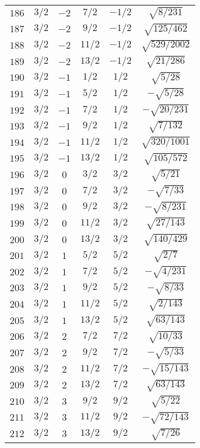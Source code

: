 \begin{table}
\begin{center}
\begin{tabular}{|c|c|c|c|c|c|}
$186$ & $3/2$ & $-2$ & $7/2$ & $-1/2$ & $\sqrt{8/231}$ \\ 
$187$ & $3/2$ & $-2$ & $9/2$ & $-1/2$ & $\sqrt{125/462}$ \\ 
$188$ & $3/2$ & $-2$ & $11/2$ & $-1/2$ & $\sqrt{529/2002}$ \\ 
$189$ & $3/2$ & $-2$ & $13/2$ & $-1/2$ & $\sqrt{21/286}$ \\ 
$190$ & $3/2$ & $-1$ & $1/2$ & $1/2$ & $\sqrt{5/28}$ \\ 
$191$ & $3/2$ & $-1$ & $5/2$ & $1/2$ & $-\sqrt{5/28}$ \\ 
$192$ & $3/2$ & $-1$ & $7/2$ & $1/2$ & $-\sqrt{20/231}$ \\ 
$193$ & $3/2$ & $-1$ & $9/2$ & $1/2$ & $\sqrt{7/132}$ \\ 
$194$ & $3/2$ & $-1$ & $11/2$ & $1/2$ & $\sqrt{320/1001}$ \\ 
$195$ & $3/2$ & $-1$ & $13/2$ & $1/2$ & $\sqrt{105/572}$ \\ 
$196$ & $3/2$ & $0$ & $3/2$ & $3/2$ & $\sqrt{5/21}$ \\ 
$197$ & $3/2$ & $0$ & $7/2$ & $3/2$ & $-\sqrt{7/33}$ \\ 
$198$ & $3/2$ & $0$ & $9/2$ & $3/2$ & $-\sqrt{8/231}$ \\ 
$199$ & $3/2$ & $0$ & $11/2$ & $3/2$ & $\sqrt{27/143}$ \\ 
$200$ & $3/2$ & $0$ & $13/2$ & $3/2$ & $\sqrt{140/429}$ \\ 
$201$ & $3/2$ & $1$ & $5/2$ & $5/2$ & $\sqrt{2/7}$ \\ 
$202$ & $3/2$ & $1$ & $7/2$ & $5/2$ & $-\sqrt{4/231}$ \\ 
$203$ & $3/2$ & $1$ & $9/2$ & $5/2$ & $-\sqrt{8/33}$ \\ 
$204$ & $3/2$ & $1$ & $11/2$ & $5/2$ & $\sqrt{2/143}$ \\ 
$205$ & $3/2$ & $1$ & $13/2$ & $5/2$ & $\sqrt{63/143}$ \\ 
$206$ & $3/2$ & $2$ & $7/2$ & $7/2$ & $\sqrt{10/33}$ \\ 
$207$ & $3/2$ & $2$ & $9/2$ & $7/2$ & $-\sqrt{5/33}$ \\ 
$208$ & $3/2$ & $2$ & $11/2$ & $7/2$ & $-\sqrt{15/143}$ \\ 
$209$ & $3/2$ & $2$ & $13/2$ & $7/2$ & $\sqrt{63/143}$ \\ 
$210$ & $3/2$ & $3$ & $9/2$ & $9/2$ & $\sqrt{5/22}$ \\ 
$211$ & $3/2$ & $3$ & $11/2$ & $9/2$ & $-\sqrt{72/143}$ \\ 
$212$ & $3/2$ & $3$ & $13/2$ & $9/2$ & $\sqrt{7/26}$ \\ 

\end{tabular}
\end{center}
\end{table}
